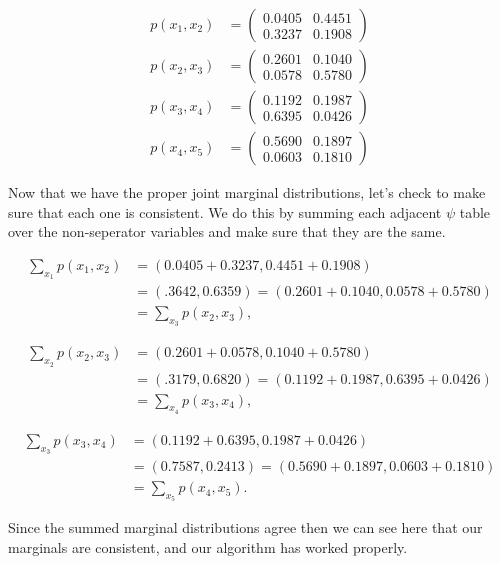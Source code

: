 \documentclass[paper=a4, fontsize=11pt]{scrartcl} %
\begin{document}
\begin{align}
p(x_1,x_2) &=
	\begin{pmatrix}
	0.0405 & 0.4451 \\
	0.3237 & 0.1908
	\end{pmatrix} \\
p(x_2,x_3) &=
	\begin{pmatrix}
	0.2601 & 0.1040 \\
    	0.0578 & 0.5780
	\end{pmatrix} \\
p(x_3,x_4) &=
	\begin{pmatrix}
	0.1192  &  0.1987 \\
    	0.6395   & 0.0426
	\end{pmatrix} \\
p(x_4,x_5) &=
	\begin{pmatrix}
	0.5690  &  0.1897 \\
    	0.0603  &  0.1810
	\end{pmatrix}
\end{align}

Now that we have the proper joint marginal distributions, let's check to make sure that each one is consistent.
We do this by summing each adjacent $\psi$ table over the non-seperator variables and make sure that they are the same.

\begin{align}
\sum_{x_1} p(x_1,x_2) &= (0.0405+0.3237,0.4451+0.1908) \\
&= (.3642,0.6359) = (0.2601+0.1040,0.0578+0.5780) \\ 
&= \sum_{x_3} p(x_2,x_3),
\end{align}

\begin{align}
\sum_{x_2} p(x_2,x_3) &= (0.2601+0.0578,0.1040+0.5780) \\
&= (.3179,0.6820) = (0.1192+0.1987,0.6395+0.0426) \\ 
&= \sum_{x_4} p(x_3,x_4),
\end{align}

\begin{align}
\sum_{x_3} p(x_3,x_4) &= (0.1192+0.6395,0.1987+0.0426) \\
&= (0.7587,0.2413) = (0.5690+0.1897,0.0603+0.1810) \\ 
&= \sum_{x_5} p(x_4,x_5).
\end{align}

Since the summed marginal distributions agree then we can see here that our marginals are consistent, and our algorithm has worked properly.
\end{document}

